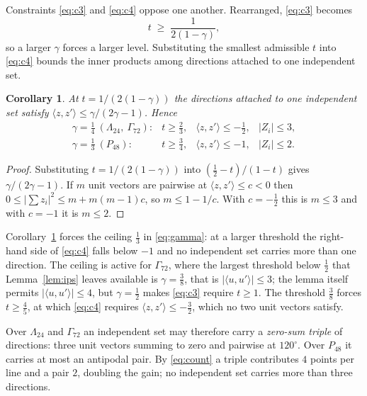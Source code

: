 \documentclass[11pt]{amsart}
\newtheorem{corollary}[theorem]{Corollary}
\theoremstyle{remark}
\newcommand{\Leech}{\Lambda_{24}}
\newcommand{\Pff}{P_{48}}
\newcommand{\Gsz}{\Gamma_{72}}
\newcommand{\ip}[2]{\langle #1,#2\rangle}
\begin{document}
Constraints \eqref{eq:c3} and \eqref{eq:c4} oppose one another. Rearranged,
\eqref{eq:c3} becomes
\begin{equation}\label{eq:tmin}
  t\;\ge\;\frac{1}{2(1-\gamma)},
\end{equation}
so a larger $\gamma$ forces a larger level. Substituting the smallest admissible
$t$ into \eqref{eq:c4} bounds the inner products among directions attached to one
independent set.

\begin{corollary}\label{cor:pairs}
At $t=1/(2(1-\gamma))$ the directions attached to one independent set satisfy
$\ip{z}{z'}\le\gamma/(2\gamma-1)$. Hence
\[
\begin{array}{llll}
  \gamma=\tfrac14 \ (\Leech,\ \Gsz): & t\ge\tfrac23, &
     \ip{z}{z'}\le-\tfrac12, & |Z_i|\le3,\\
  \gamma=\tfrac13 \ (\Pff): & t\ge\tfrac34, &
     \ip{z}{z'}\le-1, & |Z_i|\le2 .
\end{array}
\]
\end{corollary}

\begin{proof}
Substituting $t=1/(2(1-\gamma))$ into $(\tfrac12-t)/(1-t)$ gives
$\gamma/(2\gamma-1)$. If $m$ unit vectors are pairwise at $\ip{z}{z'}\le c<0$
then $0\le|\sum z_i|^2\le m+m(m-1)c$, so $m\le1-1/c$. With $c=-\tfrac12$ this
is $m\le3$ and with $c=-1$ it is $m\le2$.
\end{proof}

Corollary~\ref{cor:pairs} forces the ceiling $\tfrac13$ in \eqref{eq:gamma}: at a
larger threshold the right-hand side of \eqref{eq:c4} falls below $-1$ and no
independent set carries more than one direction. The ceiling is active for $\Gsz$,
where the largest threshold below $\tfrac12$ that Lemma~\ref{lem:ips} leaves
available is $\gamma=\tfrac38$, that is $|\ip{u}{u'}|\le3$; the lemma itself
permits $|\ip{u}{u'}|\le4$, but $\gamma=\tfrac12$ makes \eqref{eq:c3} require
$t\ge1$.
The threshold $\tfrac38$ forces $t\ge\tfrac45$, at which \eqref{eq:c4} requires
$\ip{z}{z'}\le-\tfrac32$, which no two unit vectors satisfy.

Over $\Leech$ and $\Gsz$ an independent set may therefore carry a \emph{zero-sum
triple} of directions: three unit vectors summing to zero and pairwise at
$120^\circ$. Over $\Pff$ it carries at most an antipodal pair. By
\eqref{eq:count} a triple contributes $4$ points per line and a pair $2$,
doubling the gain; no independent set carries more than three directions.
\end{document}
